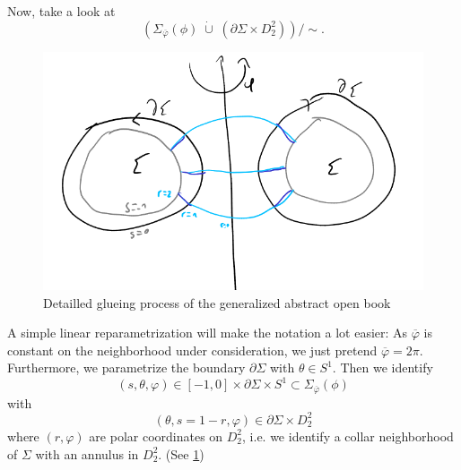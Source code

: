 Now, take a look at
\[
    \left(\Sigma_{\overline{\varphi}}(\phi)\; \dot\cup\; \left(\partial \Sigma \times D_2^2\right)\right)/\sim.
\]
\begin{figure}
    \includegraphics[width=\textwidth]{images/abstract_open_book_gluing.png}
    \caption[Glueing an abstract open book]{Detailled glueing process of the generalized abstract open book}
    \label{fig:abstract_open_book_gluing}
\end{figure}
A simple linear reparametrization will make the notation a lot easier: As $\overline{\varphi}$ is constant on the neighborhood under consideration, we just pretend $\overline{\varphi} = 2\pi$.
Furthermore, we parametrize the boundary $\partial \Sigma$ with $\theta \in S^1$.
Then we identify 
\[
    (s, \theta, \varphi) \in [-1,0] \times \partial \Sigma \times S^1 \subset \Sigma_{\overline{\varphi}}(\phi)
\]
with
\[
    (\theta, s = 1-r, \varphi) \in \partial \Sigma \times D_2^2
\]
where $(r, \varphi)$ are polar coordinates on $D_2^2$, i.e. we identify a collar neighborhood of $\Sigma$ with an annulus in $D_2^2$.
(See \cref{fig:abstract_open_book_gluing})


